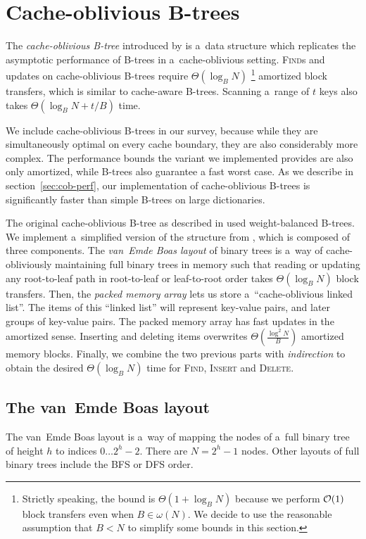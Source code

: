 \chapter{Cache-oblivious B-trees}
\label{chapter:cob}
The \emph{cache-oblivious B-tree} introduced by \cite{cobt}
is a~data structure which replicates the asymptotic performance of B-trees
in a~cache-oblivious setting.
\textsc{Find}s and updates on cache-oblivious B-trees require $\Theta(\log_B N)$
\footnote{Strictly speaking, the bound is $\Theta(1+\log_B N)$
	because we perform $\mathcal{O}(1)$ block transfers even when $B\in\omega(N)$.
	We decide to use the reasonable assumption that
	$B<N$ to simplify some bounds in this section.}
amortized block transfers, which is similar to cache-aware B-trees.
Scanning a~range of $t$ keys also takes $\Theta(\log_B N+t/B)$ time.

We include cache-oblivious B-trees in our survey, because while they
are simultaneously optimal on every cache boundary, they are also considerably
more complex. The performance bounds the variant we implemented provides are
also only amortized, while B-trees also guarantee a fast worst case.
As we describe in section~\ref{sec:cob-perf}, our implementation of
cache-oblivious B-trees is significantly faster than simple B-trees
on large dictionaries.

The original cache-oblivious B-tree as described in \cite{cobt} used
weight-balanced B-trees. We implement a~simplified version of the structure
from \cite{brodal01}, which is composed of three components.
The \emph{van~Emde Boas layout} of binary trees is a~way of cache-obliviously
maintaining full binary trees in memory such that reading or updating any
root-to-leaf path in root-to-leaf or leaf-to-root order takes $\Theta(\log_B N)$
block transfers.
Then, the \emph{packed memory array} lets us store a~``cache-oblivious linked
list''. The items of this ``linked list'' will represent key-value pairs,
and later groups of key-value pairs.
The packed memory array has fast updates in the amortized sense. Inserting
and deleting items overwrites $\Theta(\frac{\log^2 N}{B})$ amortized memory
blocks.
Finally, we combine the two previous parts with \emph{indirection} to obtain
the desired $\Theta(\log_B N)$ time for \textsc{Find}, \textsc{Insert} and
\textsc{Delete}.

\section{The van~Emde Boas layout}
The van~Emde Boas layout is a~way of mapping the nodes of a~full binary
tree of height $h$ to indices $0\ldots 2^h-2$. There are $N=2^h-1$ nodes.
Other layouts of full binary trees include the BFS or DFS order.


